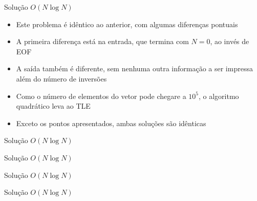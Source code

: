 \begin{frame}[fragile]{Solução $O(N\log N)$}

    \begin{itemize}
        \item Este problema é idêntico ao anterior, com algumas diferenças pontuais

        \item A primeira diferença está na entrada, que termina com $N = 0$, ao invés de EOF

        \item A saída também é diferente, sem nenhuma outra informação a ser impressa além do
            número de inversões

        \item Como o número de elementos do vetor pode chegare a  $10^5$, o algoritmo quadrático
            leva ao TLE

        \item Exceto os pontos apresentados, ambas soluções são idênticas
   \end{itemize}

\end{frame}

\begin{frame}[fragile]{Solução $O(N\log N)$}
\end{frame}

\begin{frame}[fragile]{Solução $O(N\log N)$}
\end{frame}

\begin{frame}[fragile]{Solução $O(N\log N)$}
\end{frame}

\begin{frame}[fragile]{Solução $O(N\log N)$}
\end{frame}
